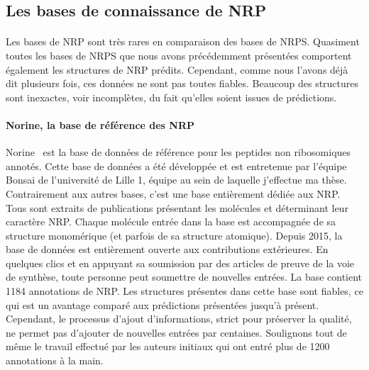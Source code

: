 \documentclass[12pt,french,twoside]{report}
\begin{document}
\subsection{Les bases de connaissance de NRP}

\label{bdd_nrp}

\paragraph{}Les bases de NRP sont très rares en comparaison des bases de NRPS.
Quasiment toutes les bases de NRPS que nous avons précédemment présentées comportent également les structures de NRP prédits.
Cependant, comme nous l'avons déjà dit plusieurs fois, ces données ne sont pas toutes fiables.
Beaucoup des structures sont inexactes, voir incomplètes, du fait qu'elles soient issues de prédictions.

\paragraph{Norine, la base de référence des NRP}
Norine~\cite{caboche_norine:_2008,flissi_norine_2016} est la base de données de référence pour les peptides non ribosomiques annotés.
Cette base de données a été développée et est entretenue par l'équipe Bonsai de l'université de Lille 1, équipe au sein de laquelle j'effectue ma thèse.
Contrairement aux autres bases, c'est une base entièrement dédiée aux NRP.
Tous sont extraits de publications présentant les molécules et déterminant leur caractère NRP.
Chaque molécule entrée dans la base est accompagnée de sa structure monomérique (et parfois de sa structure atomique).
Depuis 2015, la base de données est entièrement ouverte aux contributions extérieures.
En quelques clics et en appuyant sa soumission par des articles de preuve de la voie de synthèse, toute personne peut soumettre de nouvelles entrées.
La base contient 1184 annotations de NRP.
Les structures présentes dans cette base sont fiables, ce qui est un avantage comparé aux prédictions présentées jusqu'à présent.
Cependant, le processus d'ajout d'informations, strict pour préserver la qualité, ne permet pas d'ajouter de nouvelles entrées par centaines.
Soulignons tout de même le travail effectué par les auteurs initiaux qui ont entré plus de 1200 annotations à la main.
\end{document}
